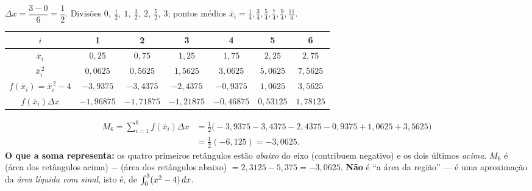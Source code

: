 \begin{exemplo}[{Exemplo 3.3 --- $f(x)=x^2-4$ em $[0,3]$, $n=6$, pontos médios (questão 5.2.3)}]
$\Delta x=\dfrac{3-0}{6}=\dfrac12$. Divisões $0,\ \tfrac12,\ 1,\ \tfrac32,\ 2,\ \tfrac52,\ 3$; pontos médios $\bar x_i = \tfrac14,\tfrac34,\tfrac54,\tfrac74,\tfrac94,\tfrac{11}4$.

\begin{center}
\small
\begin{tabular}{@{}c|cccccc@{}}
$i$ & 1 & 2 & 3 & 4 & 5 & 6\\
\hline
$\bar x_i$ & $0{,}25$ & $0{,}75$ & $1{,}25$ & $1{,}75$ & $2{,}25$ & $2{,}75$\\
$\bar x_i^{\,2}$ & $0{,}0625$ & $0{,}5625$ & $1{,}5625$ & $3{,}0625$ & $5{,}0625$ & $7{,}5625$\\
$f(\bar x_i)=\bar x_i^{\,2}-4$ & $-3{,}9375$ & $-3{,}4375$ & $-2{,}4375$ & $-0{,}9375$ & $1{,}0625$ & $3{,}5625$\\
$f(\bar x_i)\Delta x$ & $-1{,}96875$ & $-1{,}71875$ & $-1{,}21875$ & $-0{,}46875$ & $0{,}53125$ & $1{,}78125$\\
\end{tabular}
\end{center}
\begin{align*}
M_6=\sum_{i=1}^6 f(\bar x_i)\Delta x &= \frac12\big(-3{,}9375-3{,}4375-2{,}4375-0{,}9375+1{,}0625+3{,}5625\big)\\
&=\frac12(-6{,}125)=-3{,}0625 .
\end{align*}
\textbf{O que a soma representa:} os quatro primeiros retângulos estão \emph{abaixo} do eixo (contribuem negativo) e os dois últimos \emph{acima}. $M_6$ é (área dos retângulos acima) $-$ (área dos retângulos abaixo) $= 2{,}3125-5{,}375=-3{,}0625$. \textbf{Não} é ``a área da região'' --- é uma aproximação da \emph{área líquida com sinal}, isto é, de $\int_0^3(x^2-4)\,dx$.

\begin{center}
\end{center}
\end{exemplo}

